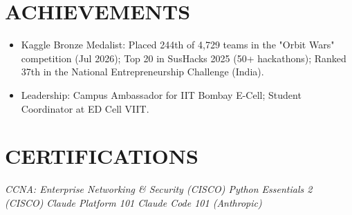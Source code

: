 \documentclass[a4paper,9pt]{extarticle}
\newcommand{\resumeItem}[1]{
  \item #1
}
\begin{document}
\section{ACHIEVEMENTS}
\begin{itemize}
  \resumeItem{Kaggle Bronze Medalist: Placed 244th of 4,729 teams in the "Orbit Wars" competition (Jul 2026); Top 20 in SusHacks 2025 (50+ hackathons); Ranked 37th in the National Entrepreneurship Challenge (India).}
  \resumeItem{Leadership: Campus Ambassador for IIT Bombay E-Cell; Student Coordinator at ED Cell VIIT.}
\end{itemize}\vspace{-3pt}

\section{CERTIFICATIONS}
\textit{CCNA: Enterprise Networking \& Security (CISCO) Python Essentials 2 (CISCO)} \hfill \textit{Claude Platform 101 \enspace\textbar\enspace Claude Code 101 (Anthropic)}\\[1pt]
\end{document}
